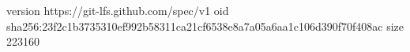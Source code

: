 version https://git-lfs.github.com/spec/v1
oid sha256:23f2c1b3735310ef992b58311ca21cf6538e8a7a05a6aa1c106d390f70f408ac
size 223160

